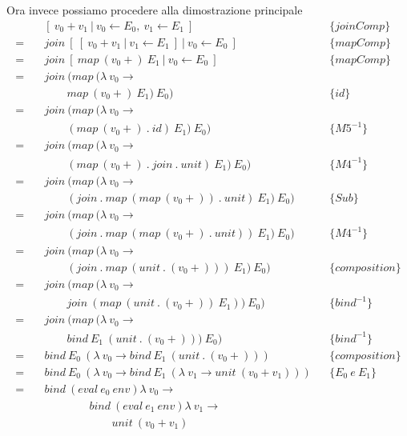 \begin{framed}
Ora invece possiamo procedere alla dimostrazione principale
\begin{align*}
    &\quad{[\ v_0 + v_1\ |\ v_0 \leftarrow E_0,\ v_1 \leftarrow E_1\ ]} && \{joinComp\}\\
    =&\quad join\ {[\ {[\ v_0 + v_1\ |\ v_1 \leftarrow E_1\ ]}\ |\ v_0 \leftarrow E_0 \ ]} && \{mapComp\}\\
    =&\quad join\ {[\ map\ (v_0+)\ E_1\ |\ v_0 \leftarrow E_0 \ ]} && \{mapComp\}\\
    =&\quad join\ (map\ (\lambda\ v_0 \to\\
     &\quad \qquad map\ (v_0+)\ E_1)\ E_0 ) && \{id\}\\
    =&\quad join\ (map\ (\lambda\ v_0 \to\\
     &\quad \qquad (map\ (v_0+)\ .\ id)\ E_1)\ E_0 ) && \{M5^{-1}\}\\
    =&\quad join\ (map\ (\lambda\ v_0 \to\\
     &\quad \qquad (map\ (v_0+)\ .\ join\ .\ unit)\ E_1)\ E_0 ) && \{M4^{-1}\}\\
    =&\quad join\ (map\ (\lambda\ v_0 \to\\
     &\quad \qquad (join\ .\ map\ (map\ (v_0+))\ .\ unit)\ E_1)\ E_0 ) && \{Sub\}\\
    =&\quad join\ (map\ (\lambda\ v_0 \to\\
     &\quad \qquad (join\ .\ map\ (map\ (v_0+)\ .\ unit))\ E_1)\ E_0 ) && \{M4^{-1}\}\\
    =&\quad join\ (map\ (\lambda\ v_0 \to\\
     &\quad \qquad (join\ .\ map\ (unit\ .\ (v_0+)))\ E_1)\ E_0 ) && \{composition\}\\
    =&\quad join\ (map\ (\lambda\ v_0 \to\\
     &\quad \qquad join\ (map\ (unit\ .\ (v_0+))\ E_1))\ E_0 ) && \{bind^{-1}\}\\
    =&\quad join\ (map\ (\lambda\ v_0 \to\\
     &\quad \qquad bind\ E_1\ (unit\ .\ (v_0+)))\ E_0 ) && \{bind^{-1}\}\\
    =&\quad bind\ E_0\ (\lambda\ v_0 \to bind\ E_1\ (unit\ .\ (v_0+))) && \{composition\}\\
    =&\quad bind\ E_0\ (\lambda\ v_0 \to bind\ E_1\ (\lambda\ v_1 \to unit\ (v_0+v_1))) && \{E_0\ e\ E_1\}\\
    =&\quad bind\ (eval\ e_0\ env) \lambda\ v_0 \to \\
     &\quad \qquad \qquad bind\ (eval\ e_1\ env) \lambda\ v_1 \to \\
     &\quad \qquad \qquad \qquad unit\ (v_0+v_1)
  \end{align*}
\end{framed}
